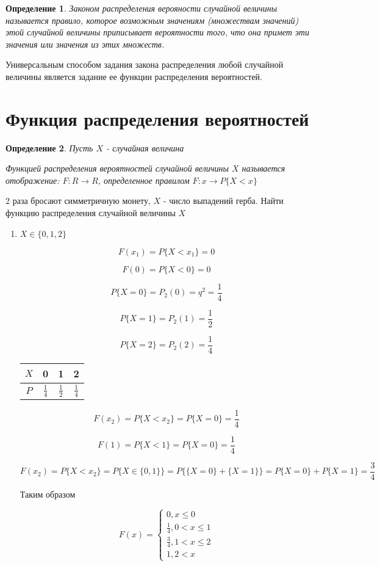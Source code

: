 \documentclass[a4paper, 14pt]{report}
\newtheorem{defenition}{Определение}[chapter]
\begin{document}
\begin{defenition}
    Законом распределения верояности случайной величины называется правило, которое возможным значениям (множествам значений) этой случайной величины приписывает вероятности того, что она примет эти значения или значения из этих множеств.
\end{defenition}

Универсальным способом задания закона распределения любой случайной величины является задание ее функции распределения вероятностей.

\section{Функция распределения вероятностей}

\begin{defenition}
    Пусть $X$ - случайная величина

    Функцией распределения вероятностей случайной величины $X$ называется отображение: $F: R \to R$, определенное правилом $F: x \to P\{X < x\}$
\end{defenition}

2 раза бросают симметричную монету, $X$ - число выпадений герба. Найти функцию распределения случайной величины $X$

\begin{enumerate}
    \item $X \in \{0,1,2\}$

        $$F(x_1) = P\{X < x_1\} = 0$$

        $$F(0) = P\{X < 0\} = 0$$

        $$P\{X=0\} = P_2(0) = q^2 = \frac{1}{4}$$

        $$P\{X=1\} = P_2(1) = \frac{1}{2}$$

        $$P\{X=2\} = P_2(2) = \frac{1}{4}$$

        \begin{tabular}{|c||c|c|c|}
            \hline
            $X$ & 0 & 1 & 2 \\
            \hline
            $P$ & $\frac{1}{4}$ & $\frac{1}{2}$ & $\frac{1}{4}$ \\
            \hline
        \end{tabular}

        $$
        F(x_2) = P\{X<x_2\} = P\{X=0\} = \frac{1}{4}
        $$

        $$
        F(1) =  P\{X<1\} = P\{X=0\} = \frac{1}{4}
        $$

        $$
        F(x_2) =  P\{X<x_2\} = P\{X\in\{0,1\}\} = P\big\{ \{X=0\} + \{X=1\} \big\} = P\{X=0\} + P\{X=1\} = \frac{3}{4}
        $$

        Таким образом

        $$
        F(x) =
        \begin{cases}
            0, x \le 0 \\
            \frac{1}{4}, 0 < x \le 1 \\
            \frac{3}{4}, 1 < x \le 2 \\
            1, 2 < x
        \end{cases}
        $$
\end{enumerate}
\end{document}
